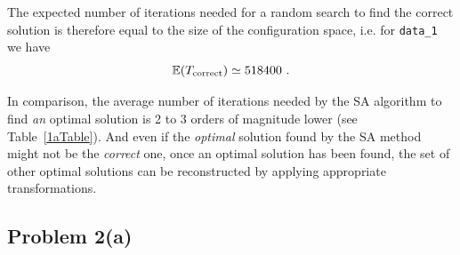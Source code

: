 \documentclass[12pt,A4,titlepage]{article}
\begin{document}
The expected number of iterations needed for a random search to find the correct solution is therefore equal to the size of the configuration space, i.e. for \texttt{data\_1} we have
\[
\mathbb{E}(T_{\textup{correct}}) \simeq 518400 \ .
\]

In comparison, the average number of iterations needed by the SA algorithm to find \emph{an} optimal solution is 2 to 3 orders of magnitude lower (see Table~\ref{1aTable}). And even if the \emph{optimal} solution found by the SA method might not be the \emph{correct} one, once an optimal solution has been found, the set of other optimal solutions can be reconstructed by applying appropriate transformations.
\clearpage



\subsection*{Problem 2(a)}

\begin{table}[H]
\caption{Optimal solutions found for \texttt{data\_2} by the implemented SA algorithm with $\alpha = 10^{-7}$.}
\label{2aTable}
\end{table}
\end{document}
